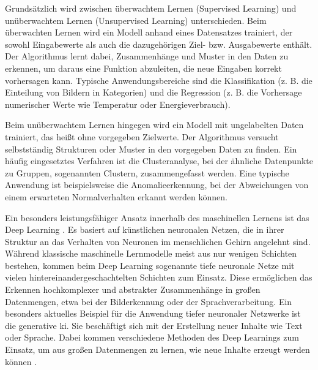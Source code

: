 Grundsätzlich wird zwischen überwachtem Lernen (Supervised Learning) und unüberwachtem Lernen (Unsupervised Learning) unterschieden.
Beim überwachten Lernen wird ein Modell anhand eines Datensatzes trainiert, der sowohl Eingabewerte als auch die dazugehörigen Ziel- bzw. Ausgabewerte enthält.
Der Algorithmus lernt dabei, Zusammenhänge und Muster in den Daten zu erkennen, um daraus eine Funktion abzuleiten, die neue Eingaben korrekt vorhersagen kann.
Typische Anwendungsbereiche sind die Klassifikation (z. B. die Einteilung von Bildern in Kategorien) und die Regression (z. B. die Vorhersage numerischer Werte wie Temperatur oder Energieverbrauch).

Beim unüberwachtem Lernen hingegen wird ein Modell mit ungelabelten Daten trainiert, das heißt ohne vorgegeben Zielwerte. 
Der Algorithmus versucht selbstständig Strukturen oder Muster in den vorgegeben Daten zu finden.
Ein häufig eingesetztes Verfahren ist die Clusteranalyse, bei der ähnliche Datenpunkte zu Gruppen, sogenannten Clustern, zusammengefasst werden. 
Eine typische Anwendung ist beispielsweise die Anomalieerkennung, bei der Abweichungen von einem erwarteten Normalverhalten erkannt werden können.

Ein besonders leistungsfähiger Ansatz innerhalb des maschinellen Lernens ist das Deep Learning \cite{DLEinordnung}.
Es basiert auf künstlichen neuronalen Netzen, die in ihrer Struktur an das Verhalten von Neuronen im menschlichen Gehirn angelehnt sind.
Während klassische maschinelle Lernmodelle meist aus nur wenigen Schichten bestehen, kommen beim Deep Learning sogenannte tiefe neuronale Netze mit vielen hintereinandergeschachtelten Schichten zum Einsatz.
Diese ermöglichen das Erkennen hochkomplexer und abstrakter Zusammenhänge in großen Datenmengen, etwa bei der Bilderkennung oder der Sprachverarbeitung. \cite{DLDefinition}
Ein besonders aktuelles Beispiel für die Anwendung tiefer neuronaler Netzwerke ist die generative \acs{ki}. 
Sie beschäftigt sich mit der Erstellung neuer Inhalte wie Text oder Sprache. 
Dabei kommen verschiedene Methoden des Deep Learnings zum Einsatz, um aus großen Datenmengen zu lernen, wie neue Inhalte erzeugt werden können \cite{GenerativeKI}.



